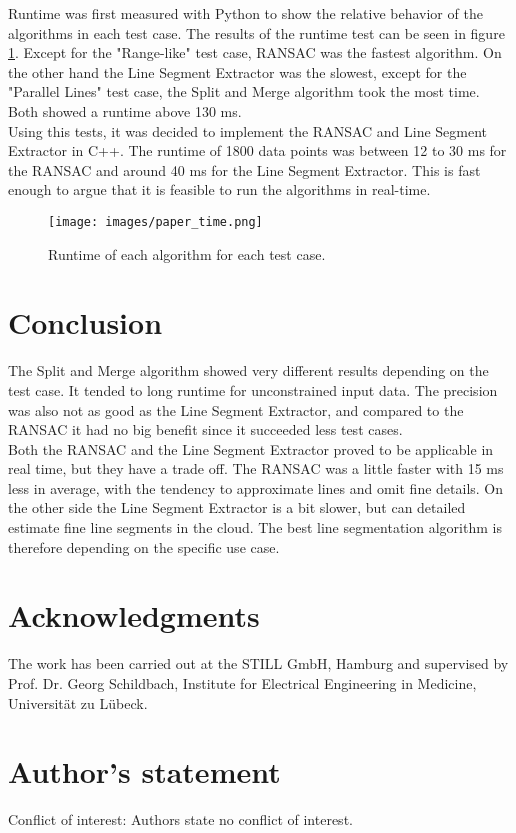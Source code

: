 \documentclass{scp}
\begin{document}
Runtime was first measured with Python to show the relative behavior of the algorithms in each test case. The results of the runtime test can be seen in figure \ref{fig:runtime}. Except for the "Range-like" test case, RANSAC was the fastest algorithm. On the other hand the Line Segment Extractor was the slowest, except for the "Parallel Lines" test case, the Split and Merge algorithm took the most time. Both showed a runtime above 130 ms. \\
Using this tests, it was decided to implement the RANSAC and Line Segment Extractor in C++. The runtime of 1800 data points was between 12 to 30 ms for the RANSAC and around 40 ms for the Line Segment Extractor. This is fast enough to argue that it is feasible to run the algorithms in real-time. 

\begin{figure}[b]
    \centering
    \texttt{[image: images/paper\_time.png]}
    \caption{Runtime of each algorithm for each test case.}
    \label{fig:runtime}
\end{figure}

\section{Conclusion}
The Split and Merge algorithm showed very different results depending on the test case. It tended to long runtime for unconstrained input data. The precision was also not as good as the Line Segment Extractor, and compared to the RANSAC it had no big benefit since it succeeded less test cases.  \\
Both the RANSAC and the Line Segment Extractor proved to be applicable in real time, but they have a trade off. The RANSAC was a little faster with 15 ms less in average, with the tendency to approximate lines and omit fine details. On the other side the Line Segment Extractor is a bit slower, but can detailed estimate fine line segments in the cloud. The best line segmentation algorithm is therefore depending on the specific use case.\\

\section*{Acknowledgments}
 The work has been carried out at the STILL GmbH, Hamburg and supervised by Prof. Dr. Georg Schildbach, Institute for Electrical Engineering in Medicine, Universität zu Lübeck.

\section*{Author’s statement}
\noindent Conflict of interest: Authors state no conflict of interest.

\printbibliography%
\end{document}

